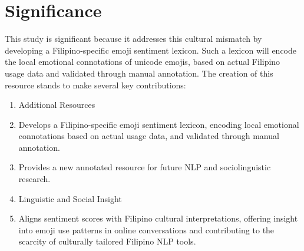 \section{Significance}
This study is significant because it addresses this cultural mismatch by developing a Filipino-specific emoji sentiment lexicon. Such a lexicon will encode the local emotional connotations of unicode emojis, based on actual Filipino usage data and validated through manual annotation. The creation of this resource stands to make several key contributions:

\begin{enumerate}
	\item Additional Resources
	\item Develops a Filipino-specific emoji sentiment lexicon, encoding local emotional connotations based on actual usage data, and validated through manual annotation.
	\item Provides a new annotated resource for future NLP and sociolinguistic research.
	\item Linguistic and Social Insight
	\item Aligns sentiment scores with Filipino cultural interpretations, offering insight into emoji use patterns in online conversations and contributing to the scarcity of culturally tailored Filipino NLP tools.
\end{enumerate}